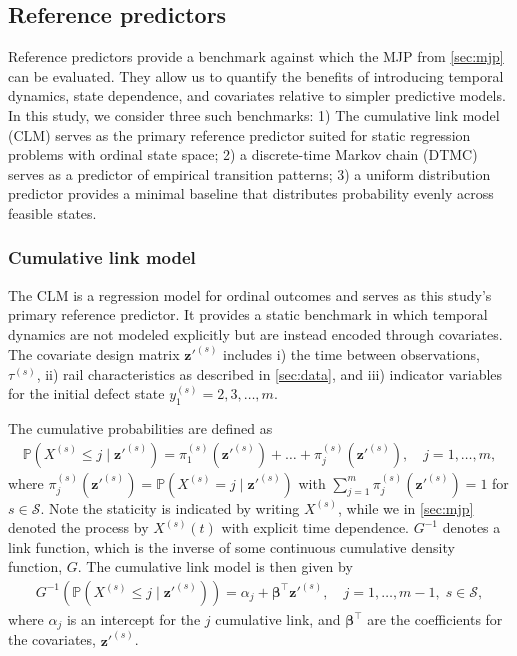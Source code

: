 \subsection{Reference predictors} \label{sec:reference_forecasts}
Reference predictors provide a benchmark against which the MJP from \cref{sec:mjp} can be evaluated. They allow us to quantify the benefits of introducing temporal dynamics, state dependence, and covariates relative to simpler predictive models.
In this study, we consider three such benchmarks: 1) The cumulative link model (CLM) serves as the primary reference predictor suited for static regression problems with ordinal state space; 
2) a discrete-time Markov chain (DTMC) serves as a predictor of empirical transition patterns; 
3) a uniform distribution predictor provides a minimal baseline that distributes probability evenly across feasible states.

\subsubsection{Cumulative link model} \label{sec:cumulative_link_model}

The CLM is a regression model for ordinal outcomes and serves as this study's primary reference predictor. It provides a static benchmark in which temporal dynamics are not modeled explicitly but are instead encoded through covariates. The covariate design matrix $\bm{z}'^{(s)}$ includes i) the time between observations, $\tau^{(s)}$, ii) rail characteristics as described in \cref{sec:data}, and iii) indicator variables for the initial defect state $y_1^{(s)} =2,3,\dots,m$. 

The cumulative probabilities are defined as
\begin{align*}
     \mathds{P}\left( X^{(s)} \leq j \; \vert \; \bm{z}'^{(s)} \right) = 
     \pi_1^{(s)}(\bm{z}'^{(s)}) + \dots + \pi_j^{(s)}(\bm{z}'^{(s)}), \quad j = 1, \dots, m, 
\end{align*}
where $\pi^{(s)}_j\left(\bm{z}'^{(s)}\right) = \mathds{P} \left(  X^{(s)} = j \; \vert \; \bm{z}'^{(s)} \right)$ with $\sum_{j = 1}^m \pi^{(s)}_j(\bm{z}'^{(s)}) = 1$ for $s \in \mathcal{S}$. 
Note the staticity is indicated by writing $X^{(s)}$, while we in \cref{sec:mjp} denoted the process by $X^{(s)}(t)$ with explicit time dependence.
$G^{-1}$ denotes a link function, which is the inverse of some continuous cumulative density function, $G$.
The cumulative link model is then given by
\begin{align}
    G^{-1} \left(  \mathds{P}\left( X^{(s)} \leq j \; \vert \; \bm{z}'^{(s)} \right) \right)
    = \alpha_j + \bm{\beta}^\top \bm{z}'^{(s)}, \quad j = 1, \dots, m-1, \; s \in \mathcal{S}, \label{eq:cum_link_model}
\end{align}
where $\alpha_j$ is an intercept for the $j$ cumulative link, and $\bm{\beta}^\top$ are the coefficients for the covariates, $\bm{z}'^{(s)}$. 

